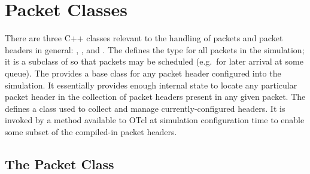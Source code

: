 \section{Packet Classes}
\label{sec:packetclasses}

There are three C++ classes relevant to the handling of packets
and packet headers in general: ,
, and .
The 
defines the type for all packets in the simulation;
it is a subclass of  so that packets may
be scheduled (e.g.~for later arrival at some queue).
The  provides a base class for
any packet header configured into the simulation.
It essentially provides 
enough internal state to locate any particular packet
header in the collection of packet headers present in any given packet.
The 
defines a class used to collect and manage currently-configured headers.
It is invoked by a method available to OTcl at simulation configuration
time to enable some subset of the compiled-in packet headers.

\subsection{The Packet Class}
\label{sec:packetclass}

